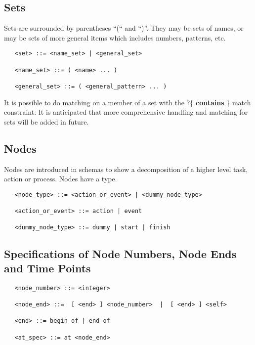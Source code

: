 \subsection{Sets}

Sets are surrounded by parentheses ``(`` and ``)''.  They may
be sets of names, or may be sets of more general items which
includes numbers, patterns, etc.

\begin{verbatim}
   <set> ::= <name_set> | <general_set>

   <name_set> ::= ( <name> ... )

   <general_set> ::= ( <general_pattern> ... )
\end{verbatim}
  

It is possible to do matching on a member of a set with the ?\{{\bf
contains}  \} match constraint.  It is anticipated that more
comprehensive handling and matching for sets will be added in future. 

\subsection{Nodes}
Nodes are introduced in schemas to show a decomposition of a higher
level task, action or process.  Nodes have a type.

\begin{verbatim}
   <node_type> ::= <action_or_event> | <dummy_node_type>

   <action_or_event> ::= action | event

   <dummy_node_type> ::= dummy | start | finish
\end{verbatim}


\subsection{Specifications of Node Numbers, Node Ends and Time Points}
  

\begin{verbatim}
   <node_number> ::= <integer>

   <node_end> ::=  [ <end> ] <node_number>  |  [ <end> ] <self>

   <end> ::= begin_of | end_of

   <at_spec> ::= at <node_end>
\end{verbatim}


